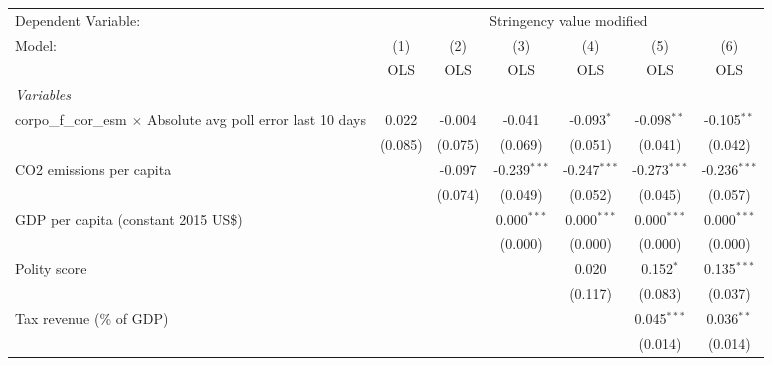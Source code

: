 
\begingroup
\centering
\begin{tabular}{lcccccc}
   \toprule
   Dependent Variable: & \multicolumn{6}{c}{Stringency value modified}\\
   Model:                                                               & (1)     & (2)     & (3)            & (4)            & (5)            & (6)\\  
                                                                        &  OLS    & OLS     & OLS            & OLS            & OLS            & OLS\\  
   \midrule
   \emph{Variables}\\
   corpo\_f\_cor\_esm $\times$ Absolute avg poll error last 10 days     & 0.022   & -0.004  & -0.041         & -0.093$^{*}$   & -0.098$^{**}$  & -0.105$^{**}$\\   
                                                                        & (0.085) & (0.075) & (0.069)        & (0.051)        & (0.041)        & (0.042)\\   
   CO2 emissions per capita                                             &         & -0.097  & -0.239$^{***}$ & -0.247$^{***}$ & -0.273$^{***}$ & -0.236$^{***}$\\   
                                                                        &         & (0.074) & (0.049)        & (0.052)        & (0.045)        & (0.057)\\   
   GDP per capita (constant 2015 US\$)                                  &         &         & 0.000$^{***}$  & 0.000$^{***}$  & 0.000$^{***}$  & 0.000$^{***}$\\   
                                                                        &         &         & (0.000)        & (0.000)        & (0.000)        & (0.000)\\   
   Polity score                                                         &         &         &                & 0.020          & 0.152$^{*}$    & 0.135$^{***}$\\   
                                                                        &         &         &                & (0.117)        & (0.083)        & (0.037)\\   
   Tax revenue (\% of GDP)                                              &         &         &                &                & 0.045$^{***}$  & 0.036$^{**}$\\   
                                                                        &         &         &                &                & (0.014)        & (0.014)\\   

\end{tabular}
